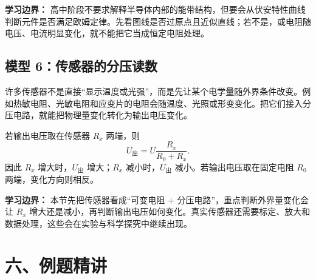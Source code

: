 \begin{center}


\label{fig:diode-iv-characteristic}
\end{center}

\textbf{学习边界：} 高中阶段不要求解释半导体内部的能带结构，但要会从伏安特性曲线判断元件是否满足欧姆定律。先看图线是否过原点且近似直线；若不是，或电阻随电压、电流明显变化，就不能把它当成恒定电阻处理。

\subsection*{模型 6：传感器的分压读数}

许多传感器不是直接“显示温度或光强”，而是先让某个电学量随外界条件改变。例如热敏电阻、光敏电阻和应变片的电阻会随温度、光照或形变变化。把它们接入分压电路，就能把物理量变化转化为输出电压变化。

\begin{center}


\label{fig:sensor-voltage-divider}
\end{center}

若输出电压取在传感器 $R_x$ 两端，则
\[
U_{\text{出}}=U\frac{R_x}{R_0+R_x}.
\]
因此 $R_x$ 增大时，$U_{\text{出}}$ 增大；$R_x$ 减小时，$U_{\text{出}}$ 减小。若输出电压取在固定电阻 $R_0$ 两端，变化方向则相反。

\textbf{学习边界：} 本节先把传感器看成“可变电阻 + 分压电路”，重点判断外界量变化会让 $R_x$ 增大还是减小，再判断输出电压如何变化。真实传感器还需要标定、放大和数据处理，这些会在实验与科学探究中继续出现。

\section*{六、例题精讲}

